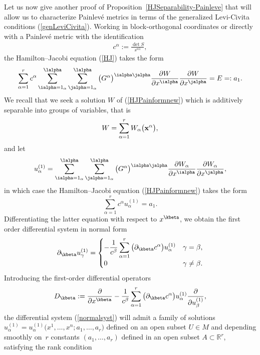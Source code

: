 Let us now give another proof of Proposition~\ref{HJSeparability-Painleve} that will allow us to characterize Painlev\'e metrics in terms of the generalized Levi-Civita conditions (\ref{genLeviCivita}). Working in block-orthogonal coordinates or directly with a Painlev\'e metric with the identification
\begin{gather}\label{not}
c^\alpha:=\frac{\det S}{s^{\alpha 1}},
\end{gather}
the Hamilton--Jacobi equation (\ref{HJ}) takes the form
\begin{gather}\label{HJPainformnew}
\sum_{\alpha =1}^{r} c^\alpha \sum_{\ialpha =1_{\alpha}}^{\lalpha}\sum_{\jalpha =1_{\alpha}}^{\lalpha} \big(G^{\alpha}\big)^{\ialpha \jalpha}\frac{\partial W}{\partial x^{\ialpha} }\frac{\partial W}{\partial x^{\jalpha}}=E=:a_{1}.
\end{gather}
We recall that we seek a solution $W$ of (\ref{HJPainformnew}) which is additively separable into groups of variables, that is
\[
W=\sum_{\alpha =1}^{r}W_{\alpha}\big({\bf x}^{\alpha}\big),
\]
and let
\[
u_{\alpha}^{(1)}=\sum_{\ialpha =1_{\alpha}}^{\lalpha}\sum_{\jalpha =1_{\alpha}}^{\lalpha}\big(G^{\alpha}\big)^{\ialpha \jalpha}\frac{\partial W_{\alpha}}{\partial x^{\ialpha} }\frac{\partial W_{\alpha}}{\partial x^{\jalpha}},
\]
in which case the Hamilton--Jacobi equation (\ref{HJPainformnew}) takes the form
\[
\sum_{\alpha =1}^{r}c^{\alpha}u_{\alpha}^{(1)}=a_{1}.
\]
Differentiating the latter equation with respect to $x^{\kbeta}$, we obtain the first order differential system in normal form
\begin{gather}\label{normalsyst}
 \partial_{\kbeta}u^{(1)}_{\gamma} =   \begin{cases}\displaystyle -\frac{1}{c^{\beta}}\sum_{\alpha =1}^{r}\big(\partial_{\kbeta} c^{\alpha}\big) u^{(1)}_{\alpha} & \gamma = \beta, \\
 0 & \gamma \neq \beta . \end{cases}
\end{gather}
Introducing the first-order differential operators
\begin{gather}\label{totaldiff}
D_{\kbeta} := \frac{\partial}{\partial x^{\kbeta}}-\frac{1}{c^{\beta}}\sum_{\alpha =1}^{r}\big(\partial_{\kbeta} c^{\alpha}\big) u^{(1)}_{\alpha}\frac{\partial}{\partial u^{(1)}_{\beta}},
\end{gather}
the differential system (\ref{normalsyst}) will admit a family of solutions $u^{(1)}_{\alpha}=u^{(1)}_{\alpha}\big(x^{1},\dots,x^{n};a_{1},\dots,a_{r}\big)$ defined on an open subset $U\in M$ and depending smoothly on~$r$ constants $(a_{1},\dots,a_{r})$ defined in an open subset $A\subset {\mathbb{R}}^{r}$, satisfying the rank condition
